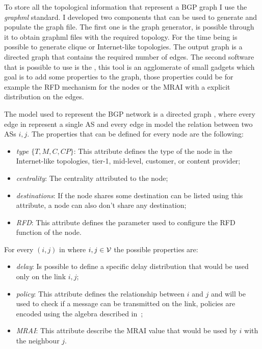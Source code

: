 To store all the topological information that represent a \ac{BGP} graph I use
the \textit{graphml} standard.
I developed two components that can be used to generate and populate the graph
file.
The first one is the graph generator, is possible through it to obtain graphml
files with the required topology. For the time being is possible to generate
clique or Internet-like topologies.
The output graph is a directed graph that contains the required number of edges.
The second software that is possible to use is the , this
tool is an agglomerate of small gadgets which goal is to add some properties to
the graph, those properties could be for example the \ac{RFD} mechanism for
the nodes or the \ac{MRAI} with a explicit distribution on the edges.

The model used to represent the \ac{BGP} network is a directed graph \graph,
where every edge in \nodeset represent a single \ac{AS} and every edge in
\edgeset model the relation between two \acp{AS} \(i,j\).
The properties that can be defined for every node are the following:
\begin{itemize}
		\item \textit{type \(\{T,M,C,CP\}\)}: This attribute defines the type
				of the node in the Internet-like topologies, tier-1,
				mid-level, customer, or content provider;
		\item \textit{centrality}: The centrality attributed to the node;
		\item \textit{destinations}: If the node shares some destination can
				be listed using this attribute, a node can also don't share
				any destination;
		\item \textit{\ac{RFD}}: This attribute defines the parameter used
				to configure the \ac{RFD} function of the node.
\end{itemize}

For every \((i,j)\) in \edgeset where \(i,j \in \mathcal{V}\) the possible properties
are:
\begin{itemize}
		\item \textit{delay}: Is possible to define a specific delay distribution
				that would be used only on the link \(i,j\);
		\item \textit{policy}: This attribute defines the relationship between
				\(i\) and \(j\) and will be used to check if a message can
				be transmitted on the link, policies are encoded using the
				algebra described in~\cite{daggitt2018rate};
		\item \textit{\ac{MRAI}}: This attribute describe the \ac{MRAI} value
				that would be used by \(i\) with the neighbour \(j\).
\end{itemize}

